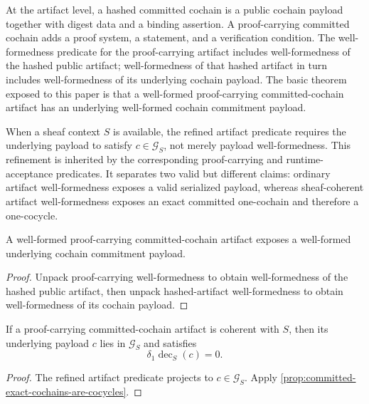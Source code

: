 At the artifact level, a hashed committed cochain is a public cochain payload
together with digest data and a binding assertion. A proof-carrying committed
cochain adds a proof system, a statement, and a verification condition. The
well-formedness predicate for the proof-carrying artifact includes
well-formedness of the hashed public artifact; well-formedness of that hashed
artifact in turn includes well-formedness of its underlying cochain payload. The
basic theorem exposed to this paper is that a well-formed proof-carrying
committed-cochain artifact has an underlying well-formed cochain commitment
payload.

When a sheaf context \(S\) is available, the refined artifact predicate
requires the underlying payload to satisfy \(c\in\mathcal G_S\), not merely
payload well-formedness. This refinement is inherited by the corresponding
proof-carrying and runtime-acceptance predicates. It separates two valid but
different claims: ordinary artifact well-formedness exposes a valid serialized
payload, whereas sheaf-coherent artifact well-formedness exposes an exact
committed one-cochain and therefore a one-cocycle.

\begin{proposition}\label{prop:proof-carrying-artifact-exposes-payload}
  A well-formed proof-carrying committed-cochain artifact exposes a well-formed
  underlying cochain commitment payload.
\end{proposition}

\begin{proof}
  Unpack proof-carrying well-formedness to obtain well-formedness of the hashed
  public artifact, then unpack hashed-artifact well-formedness to obtain
  well-formedness of its cochain payload.
\end{proof}

\begin{proposition}
\label{prop:coherent-proof-artifact-exposes-cocycle}
  If a proof-carrying committed-cochain artifact is coherent with \(S\), then
  its underlying payload \(c\) lies in \(\mathcal G_S\) and satisfies
  \[
    \delta_1\operatorname{dec}_S(c)=0.
  \]
\end{proposition}

\begin{proof}
  The refined artifact predicate projects to \(c\in\mathcal G_S\). Apply
  \cref{prop:committed-exact-cochains-are-cocycles}.
\end{proof}


